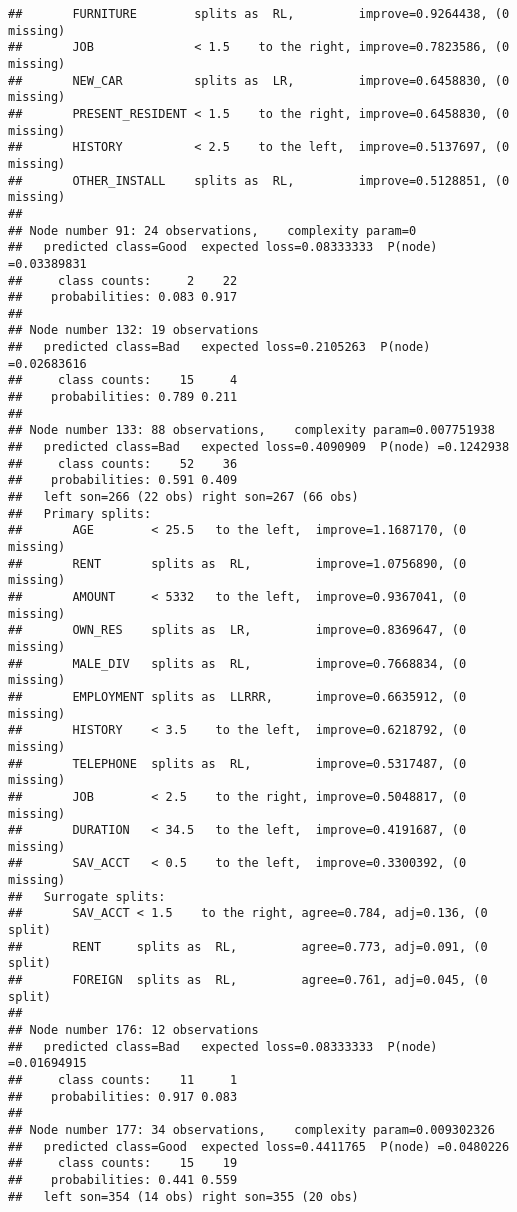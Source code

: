 \documentclass[
]{article}
\begin{document}
\begin{verbatim}
##       FURNITURE        splits as  RL,         improve=0.9264438, (0 missing)
##       JOB              < 1.5    to the right, improve=0.7823586, (0 missing)
##       NEW_CAR          splits as  LR,         improve=0.6458830, (0 missing)
##       PRESENT_RESIDENT < 1.5    to the right, improve=0.6458830, (0 missing)
##       HISTORY          < 2.5    to the left,  improve=0.5137697, (0 missing)
##       OTHER_INSTALL    splits as  RL,         improve=0.5128851, (0 missing)
## 
## Node number 91: 24 observations,    complexity param=0
##   predicted class=Good  expected loss=0.08333333  P(node) =0.03389831
##     class counts:     2    22
##    probabilities: 0.083 0.917 
## 
## Node number 132: 19 observations
##   predicted class=Bad   expected loss=0.2105263  P(node) =0.02683616
##     class counts:    15     4
##    probabilities: 0.789 0.211 
## 
## Node number 133: 88 observations,    complexity param=0.007751938
##   predicted class=Bad   expected loss=0.4090909  P(node) =0.1242938
##     class counts:    52    36
##    probabilities: 0.591 0.409 
##   left son=266 (22 obs) right son=267 (66 obs)
##   Primary splits:
##       AGE        < 25.5   to the left,  improve=1.1687170, (0 missing)
##       RENT       splits as  RL,         improve=1.0756890, (0 missing)
##       AMOUNT     < 5332   to the left,  improve=0.9367041, (0 missing)
##       OWN_RES    splits as  LR,         improve=0.8369647, (0 missing)
##       MALE_DIV   splits as  RL,         improve=0.7668834, (0 missing)
##       EMPLOYMENT splits as  LLRRR,      improve=0.6635912, (0 missing)
##       HISTORY    < 3.5    to the left,  improve=0.6218792, (0 missing)
##       TELEPHONE  splits as  RL,         improve=0.5317487, (0 missing)
##       JOB        < 2.5    to the right, improve=0.5048817, (0 missing)
##       DURATION   < 34.5   to the left,  improve=0.4191687, (0 missing)
##       SAV_ACCT   < 0.5    to the left,  improve=0.3300392, (0 missing)
##   Surrogate splits:
##       SAV_ACCT < 1.5    to the right, agree=0.784, adj=0.136, (0 split)
##       RENT     splits as  RL,         agree=0.773, adj=0.091, (0 split)
##       FOREIGN  splits as  RL,         agree=0.761, adj=0.045, (0 split)
## 
## Node number 176: 12 observations
##   predicted class=Bad   expected loss=0.08333333  P(node) =0.01694915
##     class counts:    11     1
##    probabilities: 0.917 0.083 
## 
## Node number 177: 34 observations,    complexity param=0.009302326
##   predicted class=Good  expected loss=0.4411765  P(node) =0.0480226
##     class counts:    15    19
##    probabilities: 0.441 0.559 
##   left son=354 (14 obs) right son=355 (20 obs)

\end{verbatim}
\end{document}
